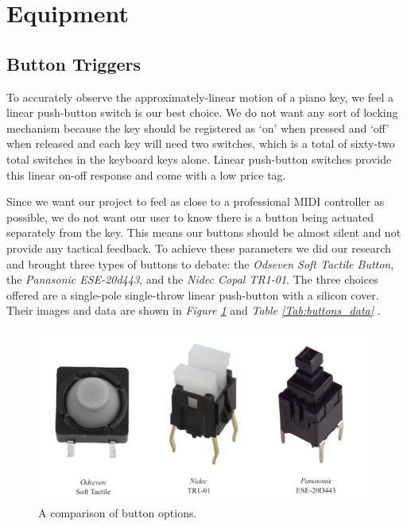 \section{Equipment}
\subsection{Button Triggers}
To accurately observe the approximately-linear motion of a piano key, we feel a linear push-button switch is our best choice. We do not want any sort of locking mechanism because the key should be registered as ‘on’ when pressed and ‘off’ when released and each key will need two switches, which is a total of sixty-two total switches in the keyboard keys alone. Linear push-button switches provide this linear on-off response and come with a low price tag.

Since we want our project to feel as close to a professional MIDI controller as possible, we do not want our user to know there is a button being actuated separately from the key. This means our buttons should be almost silent and not provide any tactical feedback. To achieve these parameters we did our research and brought three types of buttons to debate: the \textit{Odseven Soft Tactile Button}, the \textit{Panasonic ESE-20d443}, and the \textit{Nidec Copal TR1-01}. The three choices offered are a single-pole single-throw linear push-button with a silicon cover. Their images and data are shown in \textit{Figure \ref{fig:buttons_fig}} and \textit{Table \ref{Tab:buttons_data}} .

\begin{figure}[h!]
  \centering
  \includegraphics[width=\linewidth]{image/Buttons.png}
  \caption{A comparison of button options.}
  \label{fig:buttons_fig}
\end{figure}

